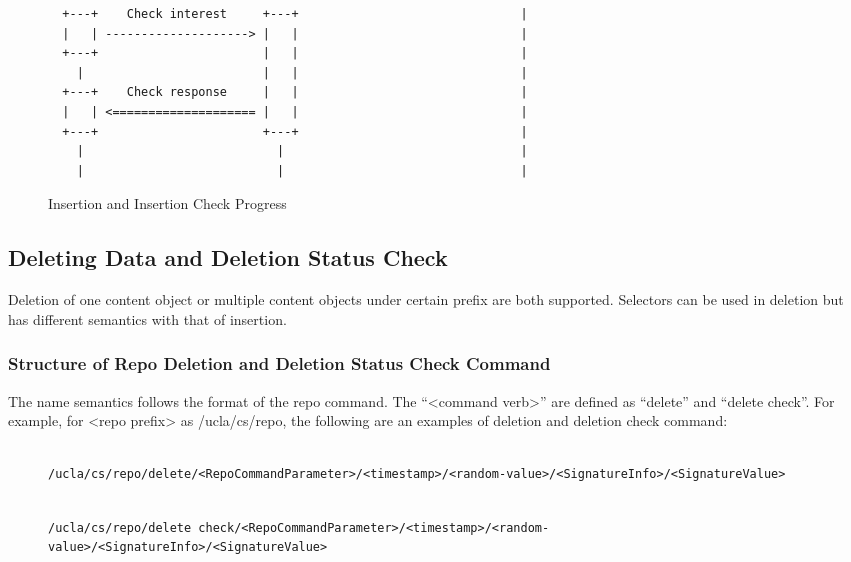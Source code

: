 \documentclass{acm_proc_article-sp}
\begin{document}
\begin{figure*}
\begin{BVerbatim}
  +---+    Check interest     +---+                               |
  |   | --------------------> |   |                               |
  +---+                       |   |                               |
    |                         |   |                               |
  +---+    Check response     |   |                               |
  |   | <==================== |   |                               |
  +---+                       +---+                               |
    |                           |                                 |
    |                           |                                 |
\end{BVerbatim}
\caption{Insertion and Insertion Check Progress}
\end{figure*}

\subsection{Deleting Data and Deletion Status Check}
Deletion of one content object or multiple content objects under certain prefix are both supported. Selectors can be used in deletion but has different semantics with that of insertion.

\subsubsection{Structure of Repo Deletion and Deletion Status Check Command}
The name semantics follows the format of the repo command. The ``<command verb>'' are defined as ``delete'' and ``delete check''. For example, for <repo prefix> as /ucla/cs/repo, the following are an examples of deletion and deletion check command:

\begin{figure*}
\begin{framed}
\begin{BVerbatim}

/ucla/cs/repo/delete/<RepoCommandParameter>/<timestamp>/<random-value>/<SignatureInfo>/<SignatureValue>

\end{BVerbatim}
\end{framed}
\end{figure*}

\begin{figure*}
\begin{framed}
\begin{BVerbatim}

/ucla/cs/repo/delete check/<RepoCommandParameter>/<timestamp>/<random-value>/<SignatureInfo>/<SignatureValue>

\end{BVerbatim}
\end{framed}
\end{figure*}
\end{document}
